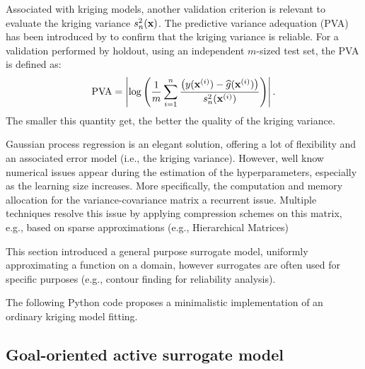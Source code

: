 Associated with kriging models, another validation criterion is relevant to evaluate the kriging variance $s_n^2({\bf x})$. 
The predictive variance adequation (PVA) has been introduced by \citet{bachoc_2013} to confirm that the kriging variance is reliable.
For a validation performed by holdout, using an independent $m$-sized test set, the PVA is defined as: 
\begin{equation}
    \mathrm{PVA} = \left| \log\left( \frac1m \sum_{i=1}^{n} \frac{\left(y({\bf x}^{(i)}) - \widehat{g}({\bf x}^{(i)})\right)}{s_n^2({\bf x}^{(i)})}\right) \right|.
\end{equation}
The smaller this quantity get, the better the quality of the kriging variance. 

Gaussian process regression is an elegant solution, offering a lot of flexibility and an associated error model (i.e., the kriging variance). 
However, well know numerical issues appear during the estimation of the hyperparameters, especially as the learning size increases. 
More specifically, the computation and memory allocation for the variance-covariance matrix a recurrent issue. 
Multiple techniques resolve this issue by applying compression schemes on this matrix, e.g., based on sparse approximations (e.g., Hierarchical Matrices)

This section introduced a general purpose surrogate model, uniformly approximating a function on a domain, however surrogates are often used for specific purposes (e.g., contour finding for reliability analysis). 


\begin{otexample}
    The following Python code proposes a minimalistic \ot implementation of an ordinary kriging model fitting. 
\end{otexample}



\subsection{Goal-oriented active surrogate model}

